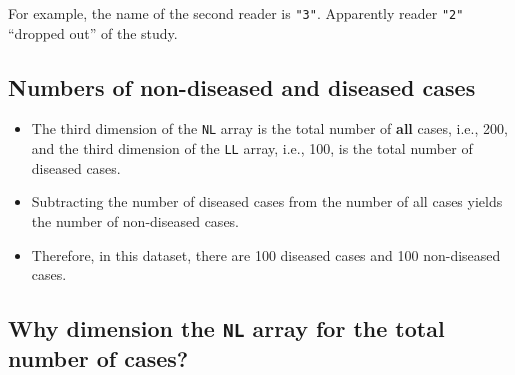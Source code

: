 \documentclass[]{book}
\newenvironment{Shaded}{\begin{snugshade}}{\end{snugshade}}
\newcommand{\CommentTok}[1]{\textcolor[rgb]{0.56,0.35,0.01}{\textit{#1}}}
\newcommand{\DecValTok}[1]{\textcolor[rgb]{0.00,0.00,0.81}{#1}}
\newcommand{\KeywordTok}[1]{\textcolor[rgb]{0.13,0.29,0.53}{\textbf{#1}}}
\newcommand{\NormalTok}[1]{#1}
\newcommand{\OperatorTok}[1]{\textcolor[rgb]{0.81,0.36,0.00}{\textbf{#1}}}
\begin{document}
\begin{Shaded}
\end{Shaded}

For example, the name of the second reader is \texttt{"3"}. Apparently reader \texttt{"2"} ``dropped out'' of the study.

\hypertarget{numbers-of-non-diseased-and-diseased-cases-1}{%
\subsection{Numbers of non-diseased and diseased cases}\label{numbers-of-non-diseased-and-diseased-cases-1}}

\begin{Shaded}
\end{Shaded}

\begin{itemize}
\item
  The third dimension of the \texttt{NL} array is the total number of \textbf{all} cases, i.e., 200, and the third dimension of the \texttt{LL} array, i.e., 100, is the total number of diseased cases.
\item
  Subtracting the number of diseased cases from the number of all cases yields the number of non-diseased cases.
\item
  Therefore, in this dataset, there are 100 diseased cases and 100 non-diseased cases.
\end{itemize}

\hypertarget{why-dimension-the-nl-array-for-the-total-number-of-cases-1}{%
\subsection{\texorpdfstring{Why dimension the \texttt{NL} array for the total number of cases?}{Why dimension the NL array for the total number of cases?}}\label{why-dimension-the-nl-array-for-the-total-number-of-cases-1}}
\end{document}
